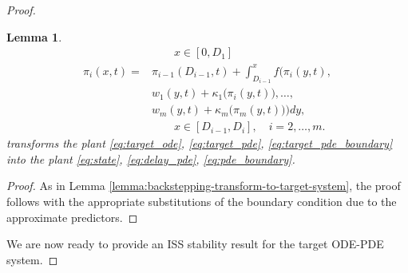 \documentclass[letterpaper, 10 pt, conference]{ieeeconf}  %
\newtheorem{lemma}[theorem]{Lemma}
\begin{document}
\begin{proof}
\begin{lemma}
\begin{subequations}
\begin{align}
            &\qquad x \in [0, D_1] \nonumber \\
        \pi_i(x,t) =& \pi_{i-1}(D_{i-1},t) + \int_{D_{i-1}}^x f \bigg( \pi_i(y,t), \nonumber \\ & w_1(y,t) + \kappa_1 \bigg( \pi_i(y,t) \bigg), \ldots, \nonumber \\ &  w_m(y,t) + \kappa_m \bigg( \pi_m(y,t) \bigg) \bigg) dy, \label{eq:pii} \\
            &\qquad x \in [D_{i-1}, D_i], \quad i=2,\dots,m. \nonumber
    \end{align}
    \end{subequations}
    transforms the plant \eqref{eq:target_ode}, \eqref{eq:target_pde}, \eqref{eq:target_pde_boundary} into the plant \eqref{eq:state}, \eqref{eq:delay_pde}, \eqref{eq:pde_boundary}. 
\end{lemma}

\begin{proof}
    As in Lemma \ref{lemma:backstepping-transform-to-target-system}, the proof follows \cite[Lemma 2]{Bekiaris-Liberis_Krstic:2016} with the appropriate substitutions of the boundary condition due to the approximate predictors. 
\end{proof}


We are now ready to provide an ISS stability result for the target ODE-PDE system. 



\end{proof}
\end{document}
